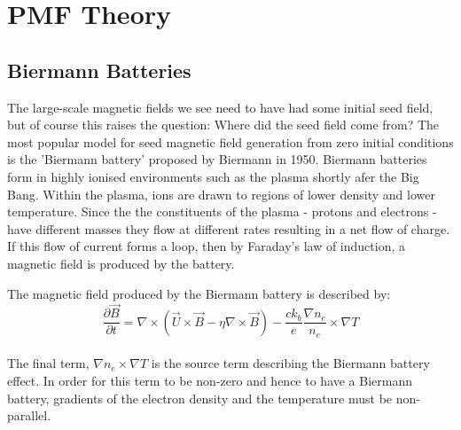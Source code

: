 \section{PMF Theory}

\iffalse
Observations of Faraday rotation in the polarisation of radio signals reveal the existence of weak coherent magnetic fields over large scales. Magnetic fields have strengths of order microgauss coherent over kPc scales. Similarly the intracluster medium possesses microgauss fields over tens of kPc. In addition, the voids between galaxy clusters are believed to have coherent nanogauss fields.
\\\\
The origin of these fields is not explained in $\Lambda$CDM cosmology. [why]. A solution to this problem are seed magnetic fields produced early in the Universe. These seed fields would be amplified through galactic dynamos and magnetohydrodynamics into the magnetic fields we observe in the present day.
\\\\
Primordial Magnetic Fields (PMFs) are a candidate for the seed magnetic fields. PMFs would have been produced during the early Universe. They may have been a result of conformal symmetry breaking during inflation, or during a phase transition - QCD to weak, say. The Biermann battery is the most standard mechanism for PMF production.
\fi
\subsection{Biermann Batteries}

The large-scale magnetic fields we see need to have had some initial seed field, but of course this raises the question: Where did the seed field come from? The most popular model for seed magnetic field generation from zero initial conditions is the 'Biermann battery' proposed by Biermann in 1950. Biermann batteries form in highly ionised environments such as the plasma shortly afer the Big Bang. Within the plasma, ions are drawn to regions of lower density and lower temperature. Since the the constituents of the plasma - protons and electrons - have different masses they flow at different rates resulting in a net flow of charge. If this flow of current forms a loop, then by Faraday's law of induction, a magnetic field is produced by the battery.

The magnetic field produced by the Biermann battery is described by:
\begin{equation}
\frac{\partial \vec{B}}{\partial t} = \nabla\times(\vec{U}\times\vec{B}-\eta\nabla \times\vec{B}) - \frac{c k_{b}}{e}\frac{\nabla n_e}{n_e} \times \nabla T
\end{equation}
\\
The final term, $\nabla n_e \times \nabla T$ is the source term describing the Biermann battery effect. In order for this term to be non-zero and hence to have a Biermann battery, gradients of the electron density and the temperature must be non-parallel.

